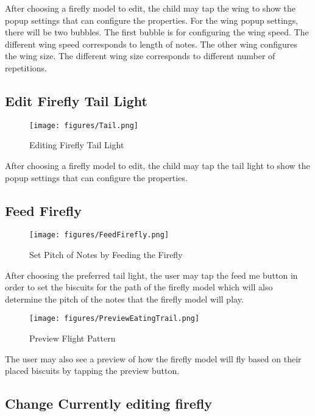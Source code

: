 After choosing a firefly model to edit, the child may tap the wing to show the popup settings that can configure the properties. For the wing popup settings, there will be two bubbles. The first bubble is for configuring the wing speed. The different wing speed corresponds to length of notes. The other wing configures the wing size. The different wing size corresponds to different number of repetitions. 

\subsection{Edit Firefly Tail Light}

\begin{figure}[H]
    \centering
    \texttt{[image: figures/Tail.png]}
    \caption{Editing Firefly Tail Light}
    \label{fig:tweakTail}
\end{figure}

After choosing a firefly model to edit, the child may tap the tail light to show the popup settings that can configure the properties.

\subsection{Feed Firefly}

\begin{figure}[H]
    \centering
    \texttt{[image: figures/FeedFirefly.png]}
    \caption{Set Pitch of Notes by Feeding the Firefly}
    \label{fig:feedfirefly}
\end{figure}

After choosing the preferred tail light, the user may tap the feed me button in order to set the biscuits for the path of the firefly model which will also determine the pitch of the notes that the firefly model will play.

\begin{figure}[H]
    \centering
    \texttt{[image: figures/PreviewEatingTrail.png]}
    \caption{Preview Flight Pattern}
    \label{fig:previewFLight}
\end{figure}

The user may also see a preview of how the firefly model will fly based on their placed biscuits by tapping the preview button.

\subsection{Change Currently editing firefly}

